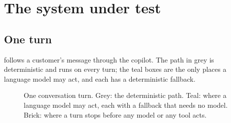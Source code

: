 \chapter{The system under test}\label{ch:system}

\section{One turn}

 follows a customer's message through the copilot. The path in grey is deterministic and runs on
every turn; the teal boxes are the only places a language model may act, and each has a deterministic fallback.

\begin{figure}[htbp]
  \centering
  \resizebox{\linewidth}{!}{}
  \caption{One conversation turn. Grey: the deterministic path. Teal: where a language model may act, each with a
  fallback that needs no model. Brick: where a turn stops before any model or any tool acts.}
  \label{fig:turn}
\end{figure}

